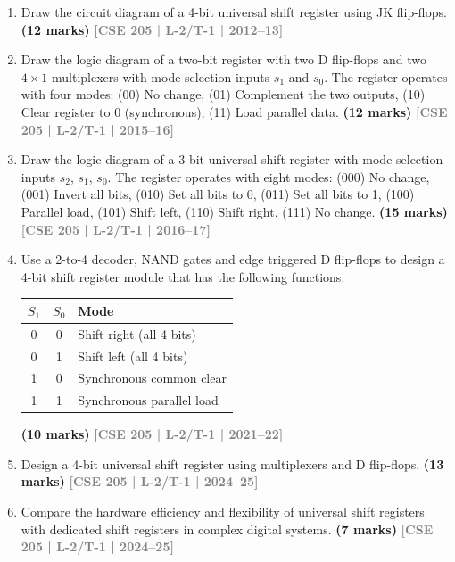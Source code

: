 \documentclass[12pt,a4paper]{article}
\newcommand{\yr}[1]{\hfill\textcolor{gray}{\small\textbf{[#1]}}}
\newcommand{\mk}[1]{\textcolor{orange!70!black}{\small\textbf{(#1 marks)}}}
\begin{document}
\begin{enumerate}

\item Draw the circuit diagram of a 4-bit universal shift register using JK flip-flops.
\mk{12} \yr{CSE 205 | L-2/T-1 | 2012--13}


\item Draw the logic diagram of a two-bit register with two D flip-flops and two $4\times1$ multiplexers with mode selection inputs $s_1$ and $s_0$. The register operates with four modes: (00) No change, (01) Complement the two outputs, (10) Clear register to 0 (synchronous), (11) Load parallel data.
\mk{12} \yr{CSE 205 | L-2/T-1 | 2015--16}


\item Draw the logic diagram of a 3-bit universal shift register with mode selection inputs $s_2$, $s_1$, $s_0$. The register operates with eight modes: (000) No change, (001) Invert all bits, (010) Set all bits to 0, (011) Set all bits to 1, (100) Parallel load, (101) Shift left, (110) Shift right, (111) No change.
\mk{15} \yr{CSE 205 | L-2/T-1 | 2016--17}

\item Use a 2-to-4 decoder, NAND gates and edge triggered D flip-flops to design a 4-bit shift register module that has the following functions:
\begin{center}
\begin{tabular}{|c|c|l|}
\hline
$S_1$ & $S_0$ & Mode \\
\hline
0 & 0 & Shift right (all 4 bits)\\
0 & 1 & Shift left (all 4 bits)\\
1 & 0 & Synchronous common clear \\
1 & 1 & Synchronous parallel load \\
\hline
\end{tabular}
\end{center}
\mk{10} \yr{CSE 205 | L-2/T-1 | 2021--22}

\item Design a 4-bit universal shift register using multiplexers and D flip-flops.
\mk{13} \yr{CSE 205 | L-2/T-1 | 2024--25}

\item Compare the hardware efficiency and flexibility of universal shift registers with dedicated shift registers in complex digital systems.
\mk{7} \yr{CSE 205 | L-2/T-1 | 2024--25}

\end{enumerate}
\end{document}
